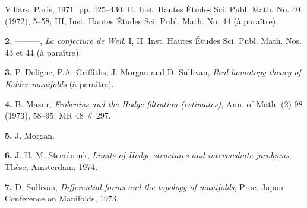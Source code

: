 \documentclass[8pt]{extarticle}
\begin{document}
\SparseReaderFont
Villars, Paris, 1971, pp. 425--430; II, Inst. Hautes Études Sci. Publ. Math. No. 40 (1972), 5--58; III, Inst. Hautes Études Sci. Publ. Math. No. 44 (à paraître).

\noindent\textbf{2.} ---\hspace{-0.2em}---\hspace{-0.2em}---, \emph{La conjecture de Weil}. I, II, Inst. Hautes Études Sci. Publ. Math. Nos. 43 et 44 (à paraître).

\noindent\textbf{3.} P. Deligne, P.A. Griffiths, J. Morgan and D. Sullivan, \emph{Real homotopy theory of Kähler manifolds} (à paraître).

\noindent\textbf{4.} B. Mazur, \emph{Frobenius and the Hodge filtration (estimates)}, Ann. of Math. (2) 98 (1973), 58--95. MR 48 \# 297.

\noindent\textbf{5.} J. Morgan.

\noindent\textbf{6.} J. H. M. Steenbrink, \emph{Limits of Hodge structures and intermediate jacobians}, Thèse, Amsterdam, 1974.

\noindent\textbf{7.} D. Sullivan, \emph{Differential forms and the topology of manifolds}, Proc. Japan Conference on Manifolds, 1973.

\vspace{8mm}

\vfill
{}
\end{document}
